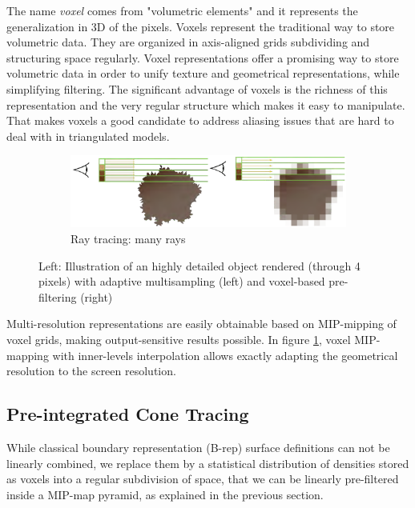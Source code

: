 The name \textit{voxel} comes from "volumetric elements" and it represents the generalization in 3D of the pixels. Voxels represent the traditional way to store volumetric data. They are organized in axis-aligned grids subdividing and structuring space regularly. Voxel representations offer a promising way to store volumetric data in order to unify texture and geometrical representations, while simplifying filtering. The significant advantage of voxels is the richness of this representation and the very regular structure which makes it easy to manipulate. That makes voxels a good candidate to address aliasing issues that are hard to deal with in triangulated models.


\begin{figure}
	\begin{subfigure}[b]{1.\textwidth}
		\includegraphics[width=1.0\textwidth]{graphics/vct/vct-4-3}
		\caption{Ray tracing: many rays}
	\end{subfigure}
	\caption{Left: Illustration of an highly detailed object rendered (through 4 pixels) with adaptive multisampling (left) and voxel-based pre-filtering (right)}
	\label{f:vct-voxel-based-pre-filtering}
\end{figure}

Multi-resolution representations are easily obtainable based on MIP-mipping of voxel grids, making output-sensitive results possible. In figure \ref{f:vct-voxel-based-pre-filtering}, voxel MIP-mapping with inner-levels interpolation allows exactly adapting the geometrical resolution to the screen resolution.




\subsection{Pre-integrated Cone Tracing}
While classical boundary representation (B-rep) surface definitions can not be linearly combined, we replace them by a statistical distribution of densities stored as voxels into a regular subdivision of space, that we can be linearly pre-filtered inside a MIP-map pyramid, as explained in the previous section.

